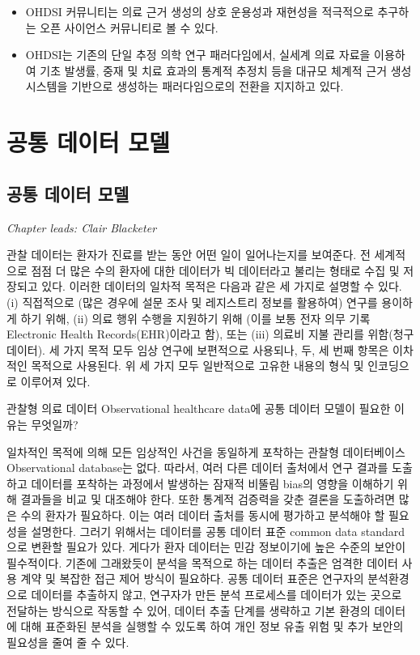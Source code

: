 \documentclass[10.5pt]{book}
\theoremstyle{definition}
\theoremstyle{definition}
\theoremstyle{definition}
\theoremstyle{remark}
\let\BeginKnitrBlock\begin \let\EndKnitrBlock\end
\begin{document}
\BeginKnitrBlock{rmdsummary}
\begin{itemize}
\item
  OHDSI 커뮤니티는 의료 근거 생성의 상호 운용성과 재현성을 적극적으로
  추구하는 오픈 사이언스 커뮤니티로 볼 수 있다.
\item
  OHDSI는 기존의 단일 추정 의학 연구 패러다임에서, 실세계 의료 자료을
  이용하여 기초 발생률, 중재 및 치료 효과의 통계적 추정치 등을 대규모
  체계적 근거 생성 시스템을 기반으로 생성하는 패러다임으로의 전환을
  지지하고 있다.
\end{itemize}
\EndKnitrBlock{rmdsummary}

\part{공통 데이터 모델}\label{part---}

\chapter{공통 데이터 모델}\label{CommonDataModel}

\emph{Chapter leads: Clair Blacketer}

관찰 데이터는 환자가 진료를 받는 동안 어떤 일이 일어나는지를 보여준다.
전 세계적으로 점점 더 많은 수의 환자에 대한 데이터가 빅 데이터라고
불리는 형태로 수집 및 저장되고 있다. 이러한 데이터의 일차적 목적은
다음과 같은 세 가지로 설명할 수 있다. (i) 직접적으로 (많은 경우에 설문
조사 및 레지스트리 정보를 활용하여) 연구를 용이하게 하기 위해, (ii) 의료
행위 수행을 지원하기 위해 (이를 보통 전자 의무 기록 Electronic Health
Records(EHR)이라고 함), 또는 (iii) 의료비 지불 관리를 위함(청구 데이터).
세 가지 목적 모두 임상 연구에 보편적으로 사용되나, 두, 세 번째 항목은
이차적인 목적으로 사용된다. 위 세 가지 모두 일반적으로 고유한 내용의
형식 및 인코딩으로 이루어져 있다. 

관찰형 의료 데이터 Observational healthcare data에 공통 데이터 모델이
필요한 이유는 무엇일까?

일차적인 목적에 의해 모든 임상적인 사건을 동일하게 포착하는 관찰형
데이터베이스 Observational database는 없다. 따라서, 여러 다른 데이터
출처에서 연구 결과를 도출하고 데이터를 포착하는 과정에서 발생하는 잠재적
비뚤림 bias의 영향을 이해하기 위해 결과들을 비교 및 대조해야 한다. 또한
통계적 검증력을 갖춘 결론을 도출하려면 많은 수의 환자가 필요하다. 이는
여러 데이터 출처를 동시에 평가하고 분석해야 할 필요성을 설명한다. 그러기
위해서는 데이터를 공통 데이터 표준 common data standard으로 변환할
필요가 있다. 게다가 환자 데이터는 민감 정보이기에 높은 수준의 보안이
필수적이다. 기존에 그래왔듯이 분석을 목적으로 하는 데이터 추출은 엄격한
데이터 사용 계약 및 복잡한 접근 제어 방식이 필요하다. 공통 데이터 표준은
연구자의 분석환경으로 데이터를 추출하지 않고, 연구자가 만든 분석
프로세스를 데이터가 있는 곳으로 전달하는 방식으로 작동할 수 있어, 데이터
추출 단계를 생략하고 기본 환경의 데이터에 대해 표준화된 분석을 실행할 수
있도록 하여 개인 정보 유출 위험 및 추가 보안의 필요성을 줄여 줄 수 있다.
\end{document}
